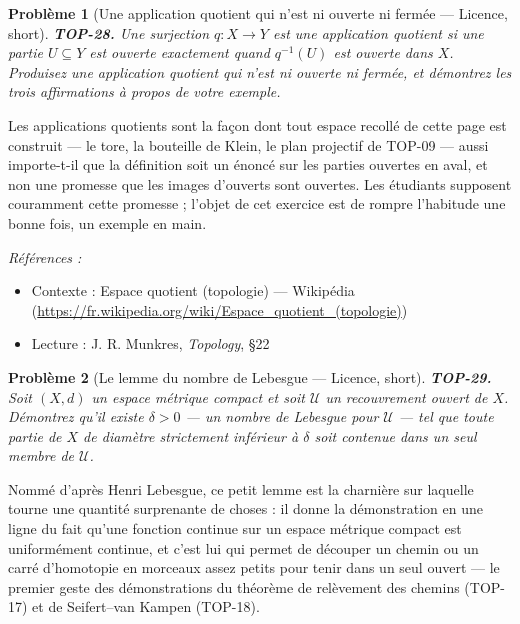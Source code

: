 \documentclass[11pt]{article}
\newtheorem{problem}{Problème}
\newenvironment{refs}{\par\small\noindent\emph{Références :}\begin{itemize}\setlength\itemsep{0pt}}{\end{itemize}\normalsize}
\begin{document}
\bigskip

\begin{problem}[{Une application quotient qui n'est ni ouverte ni fermée --- Licence, short}]
\textbf{TOP-28.} Une surjection $ q : X \to Y $ est une \textit{application
quotient} si une partie $ U \subseteq Y $ est ouverte exactement quand $ q^{-1}(U) $ est ouverte
dans $ X $. Produisez une application quotient qui n'est ni ouverte ni fermée, et démontrez les trois
affirmations à propos de votre exemple.
\end{problem}

\noindent Les applications quotients sont la façon dont tout espace recollé de cette page est
construit --- le tore, la bouteille de Klein, le plan projectif de TOP-09 --- aussi importe-t-il que la
définition soit un énoncé sur les parties ouvertes en aval, et non une promesse que les images d'ouverts
sont ouvertes. Les étudiants supposent couramment cette promesse ; l'objet de cet exercice est de rompre
l'habitude une bonne fois, un exemple en main.

\begin{refs}
\item Contexte : Espace quotient (topologie) --- Wikipédia (\url{https://fr.wikipedia.org/wiki/Espace_quotient_(topologie)})
\item Lecture : J. R. Munkres, \textit{Topology}, \S{}22
\end{refs}

\bigskip

\begin{problem}[{Le lemme du nombre de Lebesgue --- Licence, short}]
\textbf{TOP-29.} Soit $ (X,d) $ un espace métrique compact et soit
$ \mathcal{U} $ un recouvrement ouvert de $ X $. Démontrez qu'il existe $ \delta > 0 $ --- un
\textit{nombre de Lebesgue} pour $ \mathcal{U} $ --- tel que toute partie de $ X $ de diamètre
strictement inférieur à $ \delta $ soit contenue dans un seul membre de $ \mathcal{U} $.
\end{problem}

\noindent Nommé d'après Henri Lebesgue, ce petit lemme est la charnière sur laquelle tourne une
quantité surprenante de choses : il donne la démonstration en une ligne du fait qu'une fonction continue
sur un espace métrique compact est uniformément continue, et c'est lui qui permet de découper un chemin
ou un carré d'homotopie en morceaux assez petits pour tenir dans un seul ouvert --- le premier geste des
démonstrations du théorème de relèvement des chemins (TOP-17) et de Seifert--van Kampen (TOP-18).
\end{document}
